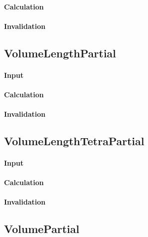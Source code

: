 \paragraph{Calculation}

\paragraph{Invalidation}

\bigskip

\subsection{VolumeLengthPartial}

\paragraph{Input}

\paragraph{Calculation}

\paragraph{Invalidation}

\bigskip

\subsection{VolumeLengthTetraPartial}

\paragraph{Input}

\paragraph{Calculation}

\paragraph{Invalidation}

\bigskip

\subsection{VolumePartial}

